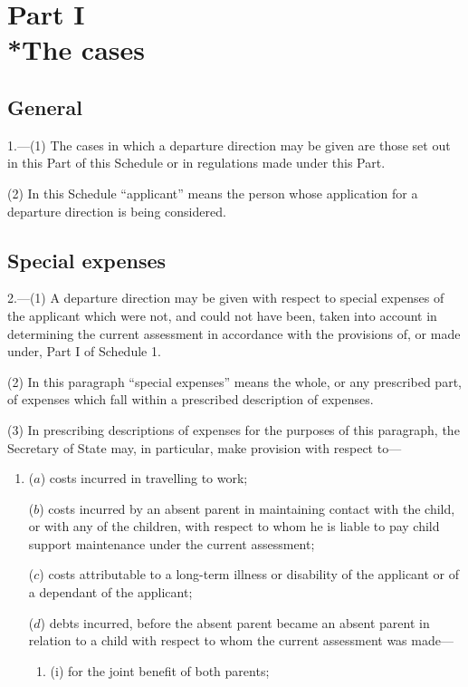 \documentclass[12pt,a4paper]{article}
\begin{document}
{

\section[Part I --- The cases]{Part I\\*The cases}

\renewcommand\parthead{--- Schedule 4B Part I}

\subsection*{General}

1.—(1) The cases in which a departure direction may be given are those set out in this Part of this Schedule or in regulations made under this Part.

(2) In this Schedule “applicant” means the person whose application for a departure direction is being considered.

\subsection*{Special expenses}

2.—(1) A departure direction may be given with respect to special expenses of the applicant which were not, and could not have been, taken into account in determining the current assessment in accordance with the provisions of, or made under, Part I of Schedule 1.

(2)
In this paragraph “special expenses” means the whole, or any prescribed part, of expenses which fall within a prescribed description of expenses.

(3)
In prescribing descriptions of expenses for the purposes of this paragraph, the Secretary of State may, in particular, make provision with respect to---
\begin{enumerate}\item[]
($a$) costs incurred in travelling to work;

($b$) costs incurred by an absent parent in maintaining contact with the child, or
with any of the children, with respect to whom he is liable to pay child
support maintenance under the current assessment;

($c$) costs attributable to a long-term illness or disability of the applicant or of a
dependant of the applicant;

($d$) debts incurred, before the absent parent became an absent parent in relation
to a child with respect to whom the current assessment was made---
\begin{enumerate}\item[]
(i)
for the joint benefit of both parents;


\end{enumerate}
\end{enumerate}}
\end{document}
